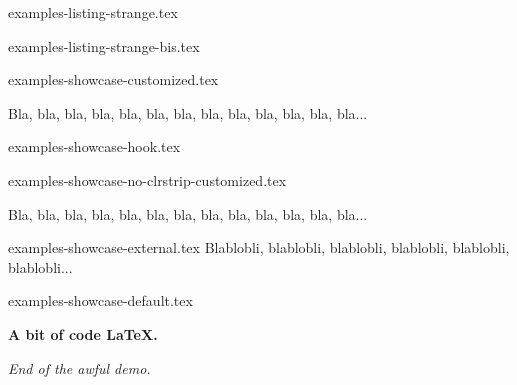 \begin{filecontents*}[overwrite]{examples-listing-strange.tex}
\begin{tdoclatex}
\end{tdoclatex}
\end{filecontents*}


\begin{filecontents*}[overwrite]{examples-listing-strange-bis.tex}
\begin{tdoclatex}
\end{tdoclatex}
\end{filecontents*}


\begin{filecontents*}[overwrite]{examples-showcase-customized.tex}
\begin{tdocshowcase}[before    = My beginning,
                     after     = My end,
                     colstripe = red,
                     coltext   = orange!75!black]
    Bla, bla, bla, bla, bla, bla, bla, bla, bla, bla, bla, bla, bla...
\end{tdocshowcase}
\end{filecontents*}


\begin{filecontents*}[overwrite]{examples-showcase-hook.tex}
\begin{tdocshowcase}
\end{tdocshowcase}
\end{filecontents*}


\begin{filecontents*}[overwrite]{examples-showcase-no-clrstrip-customized.tex}
\begin{tdocshowcase}[nostripe,
                     before    = My beginning,
                     after     = My end,
                     colstripe = green,
                     coltext   = purple]
    Bla, bla, bla, bla, bla, bla, bla, bla, bla, bla, bla, bla, bla...
\end{tdocshowcase}
\end{filecontents*}


\begin{filecontents*}[overwrite]{examples-showcase-external.tex}
Blablobli, blablobli, blablobli, blablobli, blablobli, blablobli...
\end{filecontents*}


\begin{filecontents*}[overwrite]{examples-showcase-default.tex}
\begin{tdocshowcase}
    \bfseries A bit of code \LaTeX.

    \bigskip

    \emph{\large End of the awful demo.}
\end{tdocshowcase}
\end{filecontents*}


